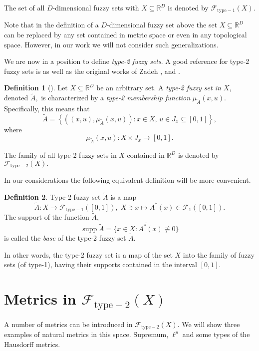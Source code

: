 \documentclass[leqno,12pt]{amsart}
\newcommand{\R}{\mathbb{R}}
\theoremstyle{remark}
\theoremstyle{remark}
\theoremstyle{remark}
\theoremstyle{definition}
\newtheorem{definition}{Definition}
\numberwithin{equation}{section}
\DeclareMathOperator{\supp}{supp}
\begin{document}
The set of all $D$-dimensional fuzzy sets with $X\subseteq\R^D$ is denoted by $\mathcal F_{\mathrm{type-1}}(X).$
\par
Note that in the definition of a $D$-dimensional fuzzy set above the set $X\subseteq\R^D$ can be replaced by any set contained in metric space or even in any topological space. However, in our work we will not consider such generalizations.
\par
We are now in a position to define {\em type-2 fuzzy sets}. A good reference for type-2 fuzzy sets is \cite{Mendel} as well as the original works of Zadeh \cite{ZadehI,ZadehII}, and \cite{ZadehIII}.
\begin{definition}[{\cite[Definition 1]{Mendel}}]\label{def1}
Let $X\subseteq\R^D$ be an arbitrary set. A {\em type-2 fuzzy set in $X$}, denoted $\tilde A,$ is characterized
by a {\em type-2 membership function} $\mu_{\tilde A}(x,u).$
Specifically, this means that
$$\tilde A=\left\{((x,u),\mu_{\tilde A}(x,u)):x\in X,\,u\in J_x\subseteq[0,1]\right\},$$
where
$$\mu_{\tilde A}(x,u):X\times J_x\to[0,1].$$
\end{definition}
The family of all type-2 fuzzy sets in $X$ contained in $\R^D$ is denoted by $\mathcal F_{\mathrm{type-2}}(X).$
\par
In our considerations the following equivalent definition will be more convenient.
\begin{definition}\label{def2}
Type-2 fuzzy set $\tilde A$ is a map
$$\tilde A: X\to\mathcal F_{\mathrm{type-1}}([0,1]),\;X\ni x\mapsto A^*(x)\in\mathcal F_1([0,1]).$$
The support
of the function $\tilde A,$
$$\supp\tilde A=\overline{\{x\in X:A^*(x)\not\equiv 0\}}$$
is called the {\em base} of the type-2 fuzzy set $\tilde A.$
\end{definition}
In other words, the type-2 fuzzy set is a map of the set $X$ into the family of fuzzy sets (of type-1), having their supports contained in the interval $[0,1].$
\section{Metrics in $\mathcal F_{\mathrm{type-2}}(X)$}
A number of metrics can be introduced in $\mathcal F_{\mathrm{type-2}}(X)$. We will show three examples of natural metrics in this space. Supremum, $\ell^p$ and some types of the Hausdorff metrics.
\end{document}
